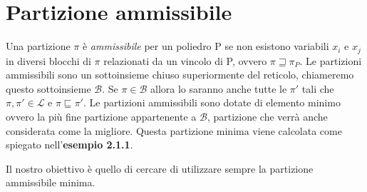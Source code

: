 \documentclass{mimosis}
\theoremstyle{definition}
\begin{document}
\section{Partizione ammissibile}
\label{sec:orgd28e933}
Una partizione \(\pi\) è \emph{ammissibile} per un poliedro P se non esistono
variabili \(x_i\) e \(x_j\) in diversi blocchi di \(\pi\) relazionati da un vincolo di
P, ovvero \(\pi \sqsupseteq \pi_P\). Le partizioni ammissibili sono un
sottoinsieme chiuso superiormente del reticolo, chiameremo questo sottoinsieme
\(\mathcal{B}\). Se \(\pi \in \mathcal{B}\) allora lo saranno anche tutte
le \(\pi'\) tali che \(\pi, \pi' \in \mathcal{L}\) e
\(\pi \sqsubseteq \pi'\). Le partizioni ammissibili sono
dotate di elemento minimo ovvero la più fine partizione appartenente a
\(\mathcal{B}\), partizione che verrà anche considerata come la migliore. Questa
partizione minima viene calcolata come spiegato nell'\textbf{esempio 2.1.1}.

Il nostro obiettivo è quello di cercare di utilizzare sempre la partizione
ammissibile minima.
\end{document}
